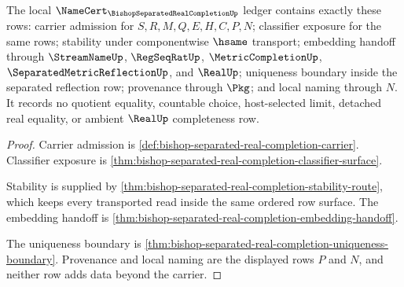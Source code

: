 \begin{theorem}
\label{thm:bishop-separated-real-completion-ledger-rows}
The local $\NameCert_{\BishopSeparatedRealCompletionUp}$ ledger contains exactly these rows: carrier admission for $S,R,M,Q,E,H,C,P,N$; classifier exposure for the same rows; stability under componentwise $\hsame$ transport; embedding handoff through $\StreamNameUp$, $\RegSeqRatUp$, $\MetricCompletionUp$, $\SeparatedMetricReflectionUp$, and $\RealUp$; uniqueness boundary inside the separated reflection row; provenance through $\Pkg$; and local naming through $N$. It records no quotient equality, countable choice, host-selected limit, detached real equality, or ambient $\RealUp$ completeness row.
\end{theorem}
\begin{proof}
Carrier admission is \autoref{def:bishop-separated-real-completion-carrier}. Classifier exposure is \autoref{thm:bishop-separated-real-completion-classifier-surface}.

Stability is supplied by \autoref{thm:bishop-separated-real-completion-stability-route}, which keeps every transported read inside the same ordered row surface. The embedding handoff is \autoref{thm:bishop-separated-real-completion-embedding-handoff}.

The uniqueness boundary is \autoref{thm:bishop-separated-real-completion-uniqueness-boundary}. Provenance and local naming are the displayed rows $P$ and $N$, and neither row adds data beyond the carrier.
\end{proof}

\begin{closurestatus}{\BishopSeparatedRealCompletionUp}
  \theoryclosure{\seedClosure}
  \formalstatus{\formalTargetV}
\end{closurestatus}
